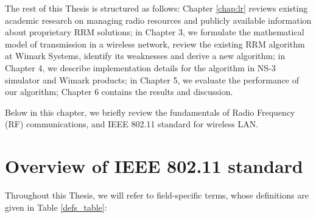 


The rest of this Thesis is structured as follows: Chapter \ref{chap:lr} reviews existing academic research on managing radio resources and publicly available information about proprietary RRM solutions; in Chapter 3, we formulate the mathematical model of transmission in a wireless network, review the existing RRM algorithm at Wimark Systems, identify its weaknesses and derive a new algorithm; in Chapter 4, we describe implementation details for the algorithm in NS-3 simulator and Wimark products; in Chapter 5, we evaluate the performance of our algorithm; Chapter 6 contains the results and discussion.



Below in this chapter, we briefly review the fundamentals of Radio Frequency (RF) communications, and IEEE 802.11 standard for wireless LAN.

\section{Overview of IEEE 802.11 standard}

Throughout this Thesis, we will refer to field-specific terms, whose definitions are given in Table \ref{defs_table}:

